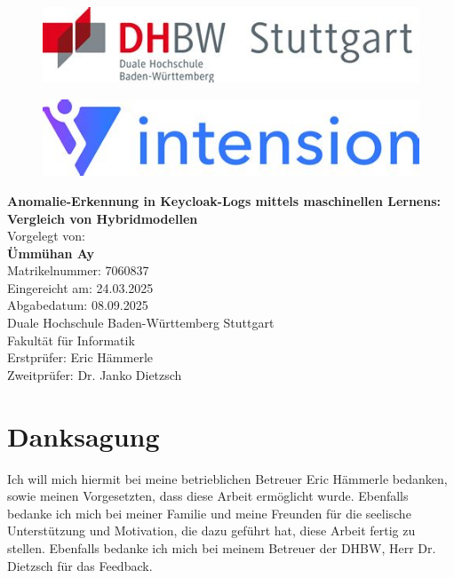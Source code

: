 \documentclass[a4paper,12pt]{article}
\begin{document}
	\thispagestyle{empty}
	
	\begin{center}
		\begin{figure}[h]
			\centering
			\begin{minipage}{0.3\linewidth}
				\centering
				\includegraphics[width=\linewidth]{Bilder/screenshot017}
				\label{fig:screenshot017}
			\end{minipage}
			\hspace{4cm}
			\begin{minipage}{0.3\linewidth}
				\centering
				\includegraphics[width=\linewidth]{Bilder/screenshot018}
				\label{fig:screenshot018}
			\end{minipage}
		\end{figure}
		\vspace*{2cm}
		\Huge\textbf{Anomalie-Erkennung in Keycloak-Logs mittels maschinellen Lernens: Vergleich von Hybridmodellen} \\[1.5cm]
		
		\normalsize
		Vorgelegt von: \\[0.3cm]
		\textbf{Ümmühan Ay} \\
		Matrikelnummer: 7060837 \\[1cm]
		
		Eingereicht am: 24.03.2025 \\[0.3cm]
		Abgabedatum: 08.09.2025 \\[1cm]
		
		Duale Hochschule Baden-Württemberg Stuttgart\\
		Fakultät für Informatik \\[2cm]
		
		Erstprüfer: Eric Hämmerle \\
		Zweitprüfer: Dr. Janko Dietzsch
		
	\end{center}
	\newpage
	\section*{Danksagung}
	Ich will mich hiermit bei meine betrieblichen Betreuer Eric Hämmerle bedanken, sowie meinen Vorgesetzten, dass diese Arbeit ermöglicht wurde. Ebenfalls bedanke ich mich bei meiner Familie und meine Freunden für die seelische Unterstützung und Motivation, die dazu geführt hat, diese Arbeit fertig zu stellen. Ebenfalls bedanke ich mich bei meinem Betreuer der DHBW, Herr Dr. Dietzsch für das Feedback.
	
\end{document}
